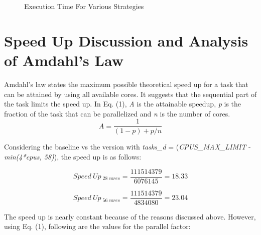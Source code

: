 \documentclass[a4paper,10pt,twoside]{article}
\begin{document}
\begin{figure}[t]
	\centering
	\caption{Execution Time For Various Strategies}
	\label{fig:ualloc}
\end{figure}

\section{Speed Up Discussion and Analysis of Amdahl's Law}
Amdahl's law states the maximum possible theoretical speed up for a task that can be attained by using all available cores. It suggests that the sequential part of the task limits the speed up. In Eq. (1), \textit{A} is the attainable speedup, \textit{p} is the fraction of the task that can be parallelized and \textit{n} is the number of cores. 
\begin{equation}
A = \frac{1}{(1-p) + p/n}
\end{equation}

Considering the baseline vs the version with \textit{tasks\_d} = (\textit{CPUS\_MAX\_LIMIT} - \textit{min(4*cpus, 58)}), the speed up is as follows: 

\begin{equation}
Speed~Up~_{28~cores} = \frac{111514379}{6076145} = 18.33
\end{equation}

\begin{equation}
Speed~Up~_{56~cores} = \frac{111514379}{4834080} = 23.04
\end{equation}

The speed up is nearly constant because of the reasons discussed above. However, using Eq. (1), following are the values for the parallel factor:
\end{document}

